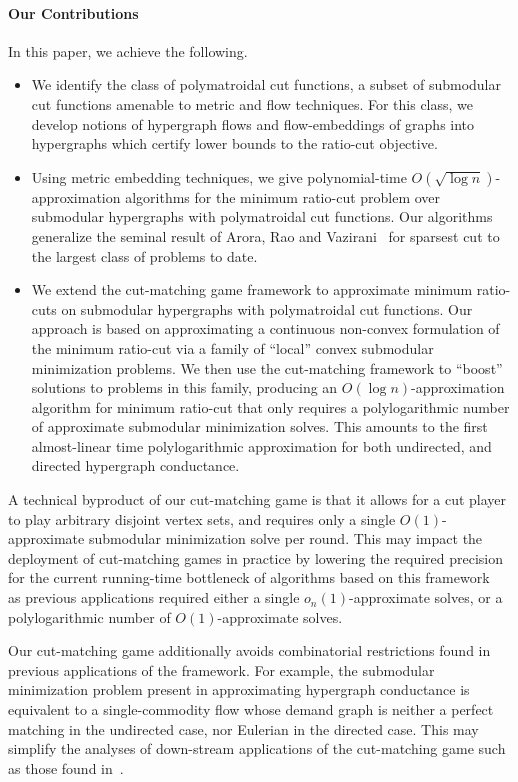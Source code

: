 \documentclass[letterpaper]{article}
\begin{document}
\paragraph{Our Contributions}

In this paper, we achieve the following.
\begin{itemize}
\item We identify the class of polymatroidal cut functions, a subset of submodular cut functions amenable to metric and flow techniques. For this class, we develop notions of hypergraph flows and flow-embeddings of graphs into hypergraphs which certify lower bounds to the ratio-cut objective.

\item Using metric embedding techniques, we give polynomial-time $O(\sqrt{\log n})$-approximation algorithms for the minimum ratio-cut problem over submodular hypergraphs with polymatroidal cut functions. Our algorithms generalize the seminal result of Arora, Rao and Vazirani~\cite{aroraSqrtLognApproximation2010} for sparsest cut to the largest class of problems to date.

\item We extend the cut-matching game framework to approximate minimum ratio-cuts on submodular hypergraphs with polymatroidal cut functions. Our approach is based on approximating a continuous non-convex formulation of the minimum ratio-cut via a family of ``local'' convex submodular minimization problems. We then use the cut-matching framework to ``boost'' solutions to problems in this family, producing an $O(\log n)$-approximation algorithm for minimum ratio-cut that only requires a polylogarithmic number of approximate submodular minimization solves. This amounts to the first almost-linear time polylogarithmic approximation for both undirected, and directed hypergraph conductance.
\end{itemize}

A technical byproduct of our cut-matching game is that it allows for a cut player to play arbitrary disjoint vertex sets, and requires only a single $O(1)$-approximate submodular minimization solve per round. This may impact the deployment of cut-matching games in practice by lowering the required precision for the current running-time bottleneck of algorithms based on this framework~\cite{orecchia2022practical, veldt2023cut} as previous applications required either a single $o_n(1)$-approximate solves, or a polylogarithmic number of $O(1)$-approximate solves.

Our cut-matching game additionally avoids combinatorial restrictions found in previous applications of the framework. For example, the submodular minimization problem present in approximating hypergraph conductance is equivalent to a single-commodity flow whose demand graph is neither a perfect matching in the undirected case, nor Eulerian in the directed case. This may simplify the analyses of down-stream applications of the cut-matching game such as those found in~\cite{bernstein2022deterministic, chuzhoyDistancedMatchingGame2023, chuzhoy2020deterministic, chuzhoyNewAlgorithmDecremental2019, long2022near, nanongkai2017dynamic}.
\end{document}
